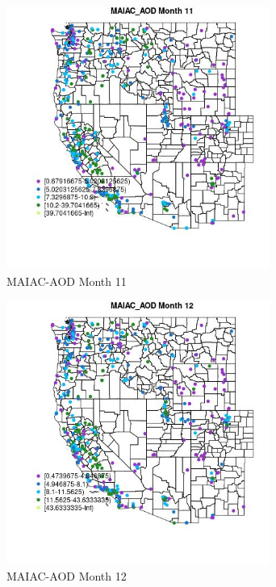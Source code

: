 \begin{figure} 
\centering  
\includegraphics[width=0.77\textwidth]{Code_Outputs/ML_input_report_ML_input_PM25_Step5_part_d_de_duplicated_aves_ML_input_MapObsMo11MAIAC_AOD.jpg} 
\caption{\label{fig:ML_input_report_ML_input_PM25_Step5_part_d_de_duplicated_aves_ML_inputMapObsMo11MAIAC_AOD}MAIAC-AOD Month 11} 
\end{figure} 
 

\clearpage 

\begin{figure} 
\centering  
\includegraphics[width=0.77\textwidth]{Code_Outputs/ML_input_report_ML_input_PM25_Step5_part_d_de_duplicated_aves_ML_input_MapObsMo12MAIAC_AOD.jpg} 
\caption{\label{fig:ML_input_report_ML_input_PM25_Step5_part_d_de_duplicated_aves_ML_inputMapObsMo12MAIAC_AOD}MAIAC-AOD Month 12} 
\end{figure} 
 

